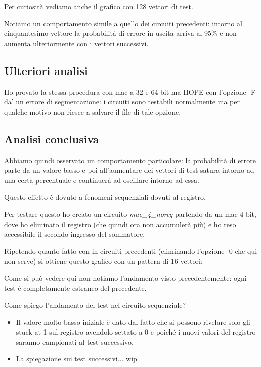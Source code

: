 \documentclass[12pt, letterpaper]{article}
\begin{document}


Per curiosità vediamo anche il grafico con 128 vettori di test.



Notiamo un comportamento simile a quello dei circuiti precedenti: intorno al cinquantesimo vettore la probabilità di errore in uscita arriva al 95\% e non aumenta ulteriormente con i vettori successivi.

\subsection{Ulteriori analisi}

Ho provato la stessa procedura con mac a 32 e 64 bit ma HOPE con l'opzione -F da' un errore di segmentazione: i circuiti sono testabili normalmente ma per qualche motivo non riesce a salvare il file di tale opzione.

\subsection{Analisi conclusiva}

Abbiamo quindi osservato un comportamento particolare: la probabilità di errore parte da un valore basso e poi all'aumentare dei vettori di test satura intorno ad una certa percentuale e continuerà ad oscillare intorno ad essa.

Questo effetto è dovuto a fenomeni sequenziali dovuti al registro.

Per testare questo ho creato un circuito \textit{mac\_4\_noreg} partendo da un mac 4 bit, dove ho eliminato il registro (che quindi ora non accumulerà più) e ho reso accessibile il secondo ingresso del sommatore.

Ripetendo quanto fatto con in circuiti precedenti (eliminando l'opzione -0 che qui non serve) si ottiene questo grafico con un pattern di 16 vettori:



Come si può vedere qui non notiamo l'andamento visto precedentemente: ogni test è completamente estraneo del precedente.

Come spiego l'andamento del test nel circuito sequenziale?

\begin{itemize}
\item Il valore molto basso iniziale è dato dal fatto che si possono rivelare solo gli stuck-at 1 sul registro avendolo settato a 0 e poiché i nuovi valori del registro saranno campionati al test successivo.
\item La spiegazione sui test successivi... wip 
\end{itemize}
\end{document}
